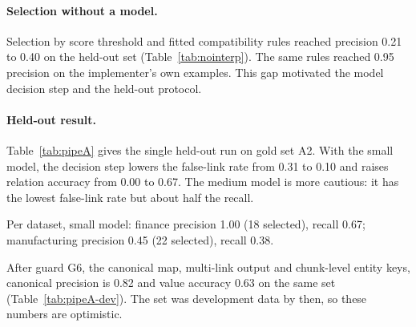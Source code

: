 \documentclass[11pt,a4paper]{article}
\begin{document}
\paragraph{Selection without a model.} Selection by score threshold and fitted compatibility rules reached precision 0.21 to 0.40 on the held-out set (Table~\ref{tab:nointerp}). The same rules reached 0.95 precision on the implementer's own examples. This gap motivated the model decision step and the held-out protocol.

\paragraph{Held-out result.} Table~\ref{tab:pipeA} gives the single held-out run on gold set A2. With the small model, the decision step lowers the false-link rate from 0.31 to 0.10 and raises relation accuracy from 0.00 to 0.67. The medium model is more cautious: it has the lowest false-link rate but about half the recall.
\begin{table}[H]
\centering\small
\caption{Pipeline A. Held-out, run once (gold set A2, 82 anchors, 53 positive).}
\label{tab:pipeA}
\end{table}

Per dataset, small model: finance precision 1.00 (18 selected), recall 0.67; manufacturing precision 0.45 (22 selected), recall 0.38.

After guard G6, the canonical map, multi-link output and chunk-level entity keys, canonical precision is 0.82 and value accuracy 0.63 on the same set (Table~\ref{tab:pipeA-dev}). The set was development data by then, so these numbers are optimistic.
\end{document}
